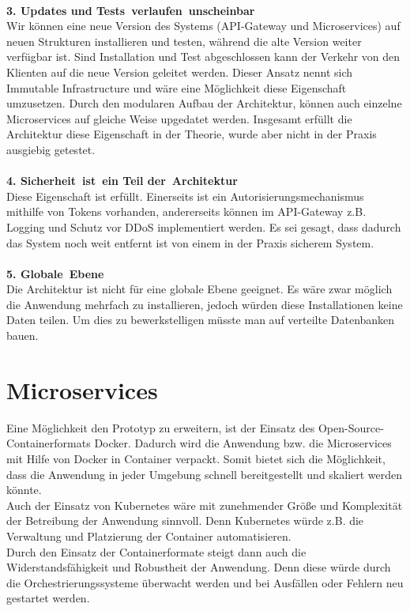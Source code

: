 \\
\textbf{3. Updates und Tests verlaufen unscheinbar}\\
Wir können eine neue Version des Systems (API-Gateway und Microservices) auf neuen Strukturen installieren und testen, während die alte Version weiter verfügbar ist. Sind Installation und Test abgeschlossen kann der Verkehr von den Klienten auf die neue Version geleitet werden. Dieser Ansatz nennt sich Immutable Infrastructure und wäre eine Möglichkeit diese Eigenschaft umzusetzen. Durch den modularen Aufbau der Architektur, können auch einzelne Microservices auf gleiche Weise upgedatet werden. Insgesamt erfüllt die Architektur diese Eigenschaft in der Theorie, wurde aber nicht in der Praxis ausgiebig getestet.\\
\\
\textbf{4. Sicherheit ist ein Teil der Architektur}\\
Diese Eigenschaft ist erfüllt. Einerseits ist ein Autorisierungsmechanismus mithilfe von Tokens vorhanden, andererseits können im API-Gateway z.B. Logging und Schutz vor DDoS implementiert werden. Es sei gesagt, dass dadurch das System noch weit entfernt ist von einem in der Praxis sicherem System.\\
\\
\textbf{5. Globale Ebene}\\
Die Architektur ist nicht für eine globale Ebene geeignet. Es wäre zwar möglich die Anwendung mehrfach zu installieren, jedoch würden diese Installationen keine Daten teilen. Um dies zu bewerkstelligen müsste man auf verteilte Datenbanken bauen.

\section{Microservices}
Eine Möglichkeit den Prototyp zu erweitern, ist der Einsatz des Open-Source-Containerformats Docker. Dadurch wird die Anwendung bzw. die Microservices mit Hilfe von Docker in Container verpackt. Somit bietet sich die Möglichkeit, dass die Anwendung in jeder Umgebung schnell bereitgestellt und skaliert werden könnte.\\
Auch der Einsatz von Kubernetes wäre mit zunehmender Größe und Komplexität der Betreibung der Anwendung sinnvoll. Denn Kubernetes würde z.B. die Verwaltung und Platzierung der Container automatisieren.\\
Durch den Einsatz der Containerformate steigt dann auch die Widerstandsfähigkeit und Robustheit der Anwendung. Denn diese würde durch die Orchestrierungssysteme überwacht werden und bei Ausfällen oder Fehlern neu gestartet werden.
 
